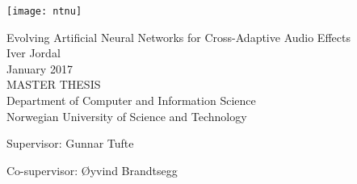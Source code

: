 
\thispagestyle{empty}
\texttt{[image: ntnu]}
\mbox{}\\[6pc]
\begin{center}
\Huge{Evolving Artificial Neural Networks for Cross-Adaptive Audio Effects}\\[2pc]

\Large{Iver Jordal}\\[1pc]
\large{January 2017}\\[2pc]

MASTER THESIS\\
Department of Computer and Information Science\\
Norwegian University of Science and Technology
\end{center}
\vfill

\noindent Supervisor: Gunnar Tufte

\noindent Co-supervisor: Øyvind Brandtsegg

